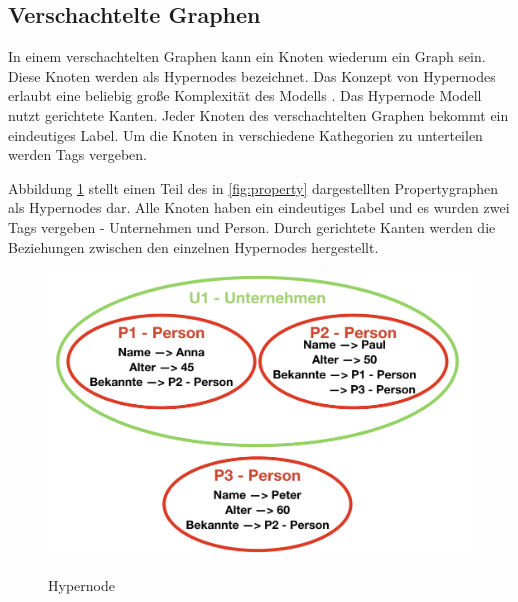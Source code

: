 \subsection{Verschachtelte Graphen}
In einem verschachtelten Graphen kann ein Knoten wiederum ein Graph sein. Diese Knoten werden als Hypernodes bezeichnet.
Das Konzept von Hypernodes erlaubt eine beliebig große Komplexität des Modells \cite{poulovassilis1994nested}.
Das Hypernode Modell nutzt gerichtete Kanten.
Jeder Knoten des verschachtelten Graphen bekommt ein eindeutiges Label.
Um die Knoten in verschiedene Kathegorien zu unterteilen werden Tags vergeben.

Abbildung \ref{fig:hypernode} stellt einen Teil des in \ref{fig:property} dargestellten Propertygraphen als Hypernodes dar.
Alle Knoten haben ein eindeutiges Label und es wurden zwei Tags vergeben - Unternehmen und Person.
Durch gerichtete Kanten werden die Beziehungen zwischen den einzelnen Hypernodes hergestellt.
\begin{figure}[H]
	\begin{center}
		\includegraphics[scale = 0.5]{./images/Hypernode.png}
		\label{fig:hypernode}
		\caption{Hypernode}
	\end{center}
\end{figure}